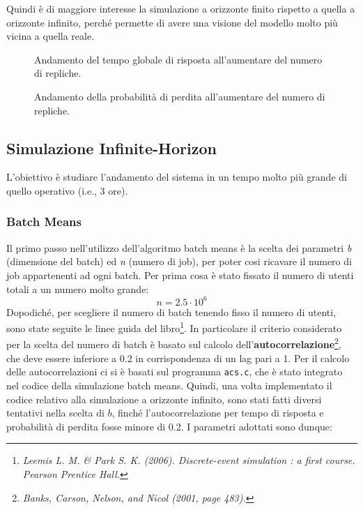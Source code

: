 \documentclass{article}
\begin{document}
Quindi è di maggiore interesse la simulazione a orizzonte finito rispetto a quella a orizzonte infinito, perché permette di avere una visione del modello molto più vicina a quella reale.

\begin{figure}[htbp]
  \centering
  
  \caption{Andamento del tempo globale di risposta all'aumentare del numero di repliche.}
  \label{fig:grt_finite_replicas}
\end{figure}

\begin{figure}[htbp]
  \centering
  
  \caption{Andamento della probabilità di perdita all'aumentare del numero di repliche.}
  \label{fig:ploss_finite_replicas}
\end{figure}
\FloatBarrier
\subsection{Simulazione Infinite-Horizon}

L'obiettivo è studiare l'andamento del sistema in un tempo molto più grande di quello operativo (i.e., 3 ore). 

\subsubsection{Batch Means}

Il primo passo nell'utilizzo dell'algoritmo batch means è la scelta dei parametri \textit{b} (dimensione del batch) ed \textit{n} (numero di job), per poter cosi ricavare il numero di job appartenenti ad ogni batch. Per prima cosa è stato fissato il numero di utenti totali a un numero molto grande:
\[n = 2.5 \cdot 10^6\]
Dopodiché, per scegliere il numero di batch tenendo fisso il numero di utenti, sono state seguite le linee guida del libro\footnote{\textit{Leemis L. M. \& Park S. K. (2006). Discrete-event simulation : a first course. Pearson Prentice Hall.}}. In particolare il criterio considerato per la scelta del numero di batch è basato sul calcolo dell'\textbf{autocorrelazione}\footnote{\textit{Banks, Carson, Nelson, and Nicol (2001, page 483).}}, che deve essere inferiore a 0.2 in corrispondenza di un lag pari a 1. Per il calcolo delle autocorrelazioni ci si è basati sul programma \texttt{acs.c}, che è stato integrato nel codice della simulazione batch means. Quindi, una volta implementato il codice relativo alla simulazione a orizzonte infinito, sono stati fatti diversi tentativi nella scelta di \(b\), finché l'autocorrelazione per tempo di risposta e probabilità di perdita fosse minore di 0.2. I parametri adottati sono dunque: 
\end{document}
